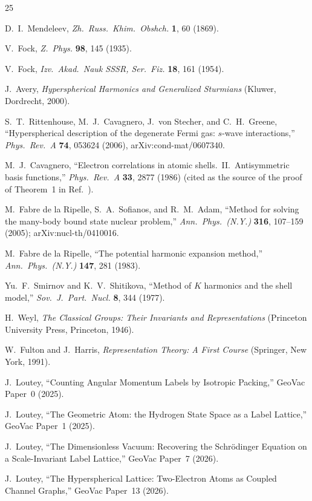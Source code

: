 \documentclass[aps,prl,twocolumn,superscriptaddress,longbibliography]{revtex4-2}
\begin{document}

\begin{thebibliography}{25}

D.~I.~Mendeleev,
\emph{Zh.\ Russ.\ Khim.\ Obshch.} \textbf{1}, 60 (1869).

V.~Fock,
\emph{Z.\ Phys.} \textbf{98}, 145 (1935).

V.~Fock,
\emph{Izv.\ Akad.\ Nauk SSSR, Ser.\ Fiz.} \textbf{18}, 161 (1954).

J.~Avery,
\emph{Hyperspherical Harmonics and Generalized Sturmians}
(Kluwer, Dordrecht, 2000).

S.~T.~Rittenhouse, M.~J.~Cavagnero, J.~von Stecher, and C.~H.~Greene,
``Hyperspherical description of the degenerate Fermi gas: $s$-wave
interactions,'' \emph{Phys.\ Rev.\ A} \textbf{74}, 053624 (2006),
arXiv:cond-mat/0607340.

M.~J.~Cavagnero, ``Electron correlations in atomic shells.\ II.\
Antisymmetric basis functions,'' \emph{Phys.\ Rev.\ A} \textbf{33}, 2877 (1986)
(cited as the source of the proof of Theorem~1 in
Ref.~\cite{Rittenhouse2006}).

M.~Fabre de la Ripelle, S.~A.~Sofianos, and R.~M.~Adam,
``Method for solving the many-body bound state nuclear problem,''
\emph{Ann.\ Phys.\ (N.Y.)} \textbf{316}, 107--159 (2005);
arXiv:nucl-th/0410016.

M.~Fabre de la Ripelle, ``The potential harmonic expansion method,''
\emph{Ann.\ Phys.\ (N.Y.)} \textbf{147}, 281 (1983).

Yu.~F.~Smirnov and K.~V.~Shitikova, ``Method of $K$ harmonics and the
shell model,'' \emph{Sov.\ J.\ Part.\ Nucl.} \textbf{8}, 344 (1977).

H.~Weyl,
\emph{The Classical Groups: Their Invariants and Representations}
(Princeton University Press, Princeton, 1946).

W.~Fulton and J.~Harris,
\emph{Representation Theory: A First Course}
(Springer, New York, 1991).

J.~Loutey,
``Counting Angular Momentum Labels by Isotropic Packing,''
GeoVac Paper~0 (2025).

J.~Loutey,
``The Geometric Atom: the Hydrogen State Space as a Label Lattice,''
GeoVac Paper~1 (2025).

J.~Loutey,
``The Dimensionless Vacuum: Recovering the Schr\"odinger Equation on a Scale-Invariant Label Lattice,''
GeoVac Paper~7 (2026).

J.~Loutey,
``The Hyperspherical Lattice: Two-Electron Atoms as Coupled Channel Graphs,''
GeoVac Paper~13 (2026).

\end{thebibliography}
\end{document}
